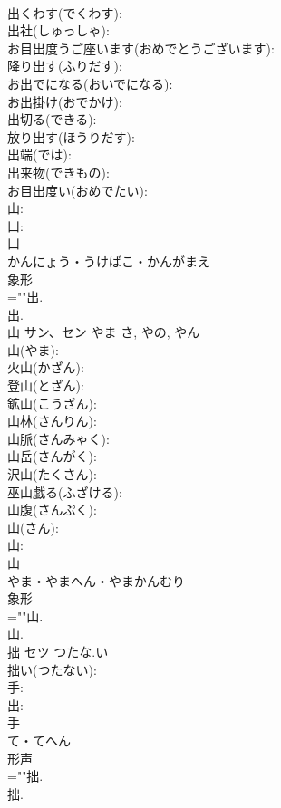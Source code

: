 \documentclass[8pt]{extreport}
\begin{document}
\begin{CJK}{UTF8}{min}
\\	出くわす(でくわす): 
\\	出社(しゅっしゃ): 
\\	お目出度うご座います(おめでとうございます): 
\\	降り出す(ふりだす): 
\\	お出でになる(おいでになる): 
\\	お出掛け(おでかけ): 
\\	出切る(できる): 
\\	放り出す(ほうりだす): 
\\	出端(では): 
\\	出来物(できもの): 
\\	お目出度い(おめでたい): 
\\	山: 
\\	凵: 
\\	凵	
\\	かんにょう・うけばこ・かんがまえ	
\\	象形 
\\	=""出.
\\	出.
\\	山	サン、セン	やま	さ, やの, やん	
\\	山(やま): 
\\	火山(かざん): 
\\	登山(とざん): 
\\	鉱山(こうざん): 
\\	山林(さんりん): 
\\	山脈(さんみゃく): 
\\	山岳(さんがく): 
\\	沢山(たくさん): 
\\	巫山戯る(ふざける): 
\\	山腹(さんぷく): 
\\	山(さん): 
\\	山: 
\\	山	
\\	やま・やまへん・やまかんむり	
\\	象形 
\\	=""山.
\\	山.
\\	拙	セツ	つたな.い		
\\	拙い(つたない): 
\\	手: 
\\	出: 
\\	手	
\\	て・てへん	
\\	形声 
\\	=""拙.
\\	拙.

\end{CJK}
\end{document}
